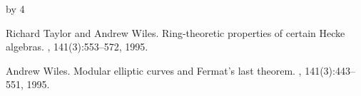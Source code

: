\documentclass[12pt]{scrartcl}
\def\anzspalten{4}
\newlength{\kastenwidth}
\newenvironment{kasten}{%
  \begin{lrbox}{\dummybox}%
    \begin{minipage}{0.96\linewidth}}%
    {\end{minipage}%
  \end{lrbox}%
  \raisebox{-\depth}{\psshadowbox[framesep=1em]{\usebox{\dummybox}}}\\[0.5em]}
\newenvironment{spalte}{%
  \setlength\kastenwidth{1.2\textwidth}
  \divide\kastenwidth by \anzspalten
  \begin{minipage}[t]{\kastenwidth}}{\end{minipage}\hfill}
\begin{document}
\begin{lrbox}{\spalten}
{\begin{spalte}
\begin{kasten}
{\begin{thebibliography}{10}

Richard Taylor and Andrew Wiles.
\newblock Ring-theoretic properties of certain {H}ecke algebras.
, 141(3):553--572, 1995.

Andrew Wiles.
\newblock Modular elliptic curves and {F}ermat's last theorem.
, 141(3):443--551, 1995.


\end{thebibliography}
} %
\end{kasten}

\end{spalte}
    }
    \end{lrbox}
\resizebox*{0.98\textwidth}{!}{%
  \usebox{\spalten}}\hfill\mbox{}\vfill
\end{document}
